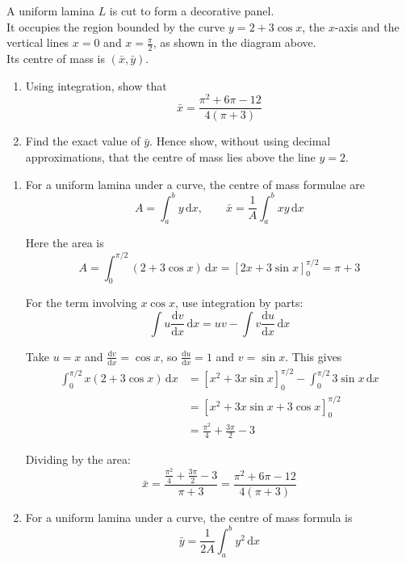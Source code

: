 \documentclass[leqno]{article}
\begin{document}
\begin{enumerate}[
  label=\textbf{\arabic*.},
  leftmargin=*,
  topsep=0pt,
  partopsep=0pt,
  parsep=0pt
]
A uniform lamina $L$ is cut to form a decorative panel. \\
It occupies the region bounded by the curve $y=2+3\cos x$, the $x$-axis and the vertical lines $x=0$ and $x=\frac{\pi}{2}$, as shown in the diagram above. \\
Its centre of mass is $(\bar{x},\bar{y})$. \\

\begin{enumerate}[label=\textbf{(\alph*)}]
  \item Using integration, show that
  \[
  \bar{x}=\dfrac{\pi^2+6\pi-12}{4(\pi+3)}
  \] 
  \item Find the exact value of $\bar{y}$. Hence show, without using decimal approximations, that the centre of mass lies above the line $y=2$.  \\
\end{enumerate}

\vspace*{10pt}

\begin{djsSolution}
\begin{enumerate}[label=\textbf{(\alph*)}, start=1]
\item For a uniform lamina under a curve, the centre of mass formulae are
\[
A=\int_a^b y\,\mathrm{d}x,
\qquad
\bar{x}=\frac{1}{A}\int_a^b xy\,\mathrm{d}x
\]

Here the area is
\[
A=\int_0^{\pi/2}(2+3\cos x)\,\mathrm{d}x
=\left[2x+3\sin x\right]_0^{\pi/2}
=\pi+3
\]

For the term involving \(x\cos x\), use integration by parts:
\[
\int u\frac{\mathrm{d}v}{\mathrm{d}x}\,\mathrm{d}x=uv-\int v\frac{\mathrm{d}u}{\mathrm{d}x}\,\mathrm{d}x
\]

Take \(u=x\) and \(\frac{\mathrm{d}v}{\mathrm{d}x}=\cos x\), so \(\frac{\mathrm{d}u}{\mathrm{d}x}=1\) and \(v=\sin x\). This gives
\begin{align*}
\int_0^{\pi/2}x(2+3\cos x)\,\mathrm{d}x
&=\left[x^2+3x\sin x\right]_0^{\pi/2}-\int_0^{\pi/2}3\sin x\,\mathrm{d}x\\
&=\left[x^2+3x\sin x+3\cos x\right]_0^{\pi/2}\\
&=\frac{\pi^2}{4}+\frac{3\pi}{2}-3
\end{align*}

Dividing by the area:
\[
\bar{x}
=\frac{\frac{\pi^2}{4}+\frac{3\pi}{2}-3}{\pi+3}
=\dfrac{\pi^2+6\pi-12}{4(\pi+3)}
\]

\item For a uniform lamina under a curve, the centre of mass formula is
\[
\bar{y}=\frac{1}{2A}\int_a^b y^2\,\mathrm{d}x
\]


\end{enumerate}
\end{djsSolution}
\end{enumerate}
\end{document}
